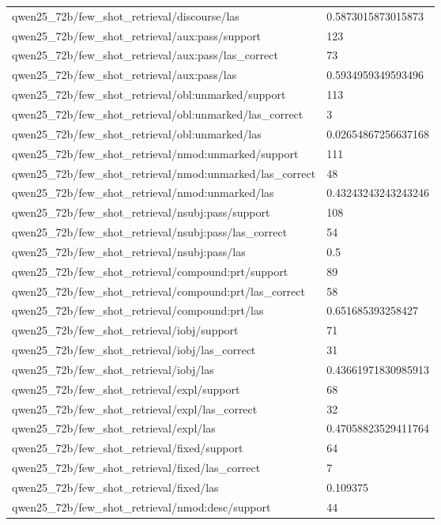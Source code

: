 \begin{tabular}{ll}
qwen25\_72b/few\_shot\_retrieval/discourse/las & 0.5873015873015873 \\
qwen25\_72b/few\_shot\_retrieval/aux:pass/support & 123 \\
qwen25\_72b/few\_shot\_retrieval/aux:pass/las\_correct & 73 \\
qwen25\_72b/few\_shot\_retrieval/aux:pass/las & 0.5934959349593496 \\
qwen25\_72b/few\_shot\_retrieval/obl:unmarked/support & 113 \\
qwen25\_72b/few\_shot\_retrieval/obl:unmarked/las\_correct & 3 \\
qwen25\_72b/few\_shot\_retrieval/obl:unmarked/las & 0.02654867256637168 \\
qwen25\_72b/few\_shot\_retrieval/nmod:unmarked/support & 111 \\
qwen25\_72b/few\_shot\_retrieval/nmod:unmarked/las\_correct & 48 \\
qwen25\_72b/few\_shot\_retrieval/nmod:unmarked/las & 0.43243243243243246 \\
qwen25\_72b/few\_shot\_retrieval/nsubj:pass/support & 108 \\
qwen25\_72b/few\_shot\_retrieval/nsubj:pass/las\_correct & 54 \\
qwen25\_72b/few\_shot\_retrieval/nsubj:pass/las & 0.5 \\
qwen25\_72b/few\_shot\_retrieval/compound:prt/support & 89 \\
qwen25\_72b/few\_shot\_retrieval/compound:prt/las\_correct & 58 \\
qwen25\_72b/few\_shot\_retrieval/compound:prt/las & 0.651685393258427 \\
qwen25\_72b/few\_shot\_retrieval/iobj/support & 71 \\
qwen25\_72b/few\_shot\_retrieval/iobj/las\_correct & 31 \\
qwen25\_72b/few\_shot\_retrieval/iobj/las & 0.43661971830985913 \\
qwen25\_72b/few\_shot\_retrieval/expl/support & 68 \\
qwen25\_72b/few\_shot\_retrieval/expl/las\_correct & 32 \\
qwen25\_72b/few\_shot\_retrieval/expl/las & 0.47058823529411764 \\
qwen25\_72b/few\_shot\_retrieval/fixed/support & 64 \\
qwen25\_72b/few\_shot\_retrieval/fixed/las\_correct & 7 \\
qwen25\_72b/few\_shot\_retrieval/fixed/las & 0.109375 \\
qwen25\_72b/few\_shot\_retrieval/nmod:desc/support & 44 \\

\end{tabular}
